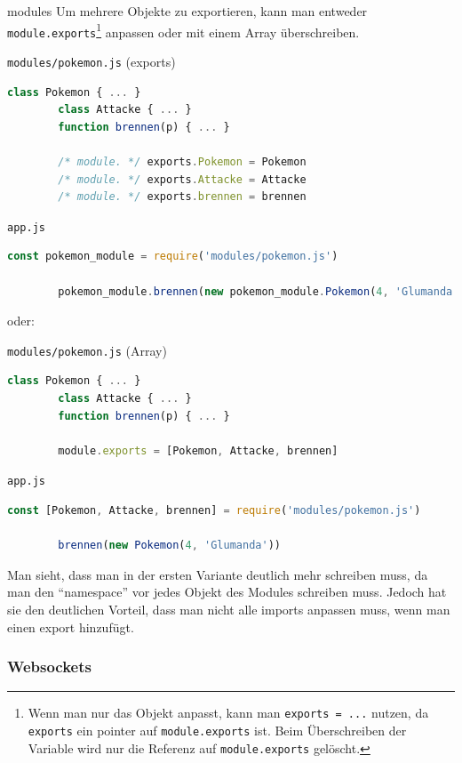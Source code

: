 \begin{example}{modules}
    Um mehrere Objekte zu exportieren, kann man entweder \texttt{module.exports}\footnote{
        Wenn man nur das Objekt anpasst, kann man \texttt{exports = ...} nutzen, da \texttt{exports} ein pointer auf \texttt{module.exports} ist.
        Beim Überschreiben der Variable wird nur die Referenz auf \texttt{module.exports} gelöscht.
    } anpassen oder mit einem Array überschreiben.

    \texttt{modules/pokemon.js} (exports)
    \begin{lstlisting}[language=JavaScript]
        class Pokemon { ... }
        class Attacke { ... }
        function brennen(p) { ... }

        /* module. */ exports.Pokemon = Pokemon
        /* module. */ exports.Attacke = Attacke
        /* module. */ exports.brennen = brennen
    \end{lstlisting}

    \texttt{app.js}
    \begin{lstlisting}[language=JavaScript]
        const pokemon_module = require('modules/pokemon.js')

        pokemon_module.brennen(new pokemon_module.Pokemon(4, 'Glumanda'))
    \end{lstlisting}

    oder:

    \texttt{modules/pokemon.js} (Array)
    \begin{lstlisting}[language=JavaScript]
        class Pokemon { ... }
        class Attacke { ... }
        function brennen(p) { ... }

        module.exports = [Pokemon, Attacke, brennen]
    \end{lstlisting}

    \texttt{app.js}
    \begin{lstlisting}[language=JavaScript]
        const [Pokemon, Attacke, brennen] = require('modules/pokemon.js')

        brennen(new Pokemon(4, 'Glumanda'))
    \end{lstlisting}

    Man sieht, dass man in der ersten Variante deutlich mehr schreiben muss, da man den \enquote{namespace} vor jedes Objekt des Modules schreiben muss.
    Jedoch hat sie den deutlichen Vorteil, dass man nicht alle imports anpassen muss, wenn man einen export hinzufügt.
\end{example}

\subsubsection{Websockets}

